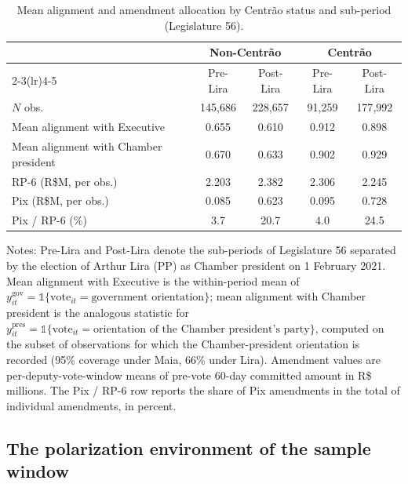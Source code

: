 \documentclass[pdflatex,sn-basic]{sn-jnl}
\begin{document}
\begin{table}[htbp]
\centering
\caption{Mean alignment and amendment allocation by Centr\~ao status and sub-period (Legislature 56).}
\label{tab:centrao_descriptive}
\small
\setlength{\tabcolsep}{6pt}
\begin{tabular}{lcccc}
\toprule
& \multicolumn{2}{c}{Non-Centr\~ao} & \multicolumn{2}{c}{Centr\~ao} \\
\cmidrule(lr){2-3}\cmidrule(lr){4-5}
& Pre-Lira & Post-Lira & Pre-Lira & Post-Lira \\
\midrule
$N$ obs.                              & 145{,}686 & 228{,}657 &  91{,}259 & 177{,}992 \\
Mean alignment with Executive         & 0.655 & 0.610 & 0.912 & 0.898 \\
Mean alignment with Chamber president & 0.670 & 0.633 & 0.902 & 0.929 \\
RP-6 (R\$M, per obs.)                  & 2.203 & 2.382 & 2.306 & 2.245 \\
Pix (R\$M, per obs.)                   & 0.085 & 0.623 & 0.095 & 0.728 \\
Pix / RP-6 (\%)                       & 3.7   & 20.7  & 4.0   & 24.5  \\
\bottomrule
\end{tabular}
\begin{tablenotes}
\small
\item Notes: Pre-Lira and Post-Lira denote the sub-periods of Legislature 56 separated by the election of Arthur Lira (PP) as Chamber president on 1 February 2021. Mean alignment with Executive is the within-period mean of $y_{it}^{\mathrm{gov}} = \mathbb{1}\{\text{vote}_{it} = \text{government orientation}\}$; mean alignment with Chamber president is the analogous statistic for $y_{it}^{\mathrm{pres}} = \mathbb{1}\{\text{vote}_{it} = \text{orientation of the Chamber president's party}\}$, computed on the subset of observations for which the Chamber-president orientation is recorded (95\% coverage under Maia, 66\% under Lira). Amendment values are per-deputy-vote-window means of pre-vote 60-day committed amount in R\$ millions. The Pix / RP-6 row reports the share of Pix amendments in the total of individual amendments, in percent.
\end{tablenotes}
\end{table}

\subsection{The polarization environment of the sample window}
\label{subsec:polarization_context}
\end{document}
